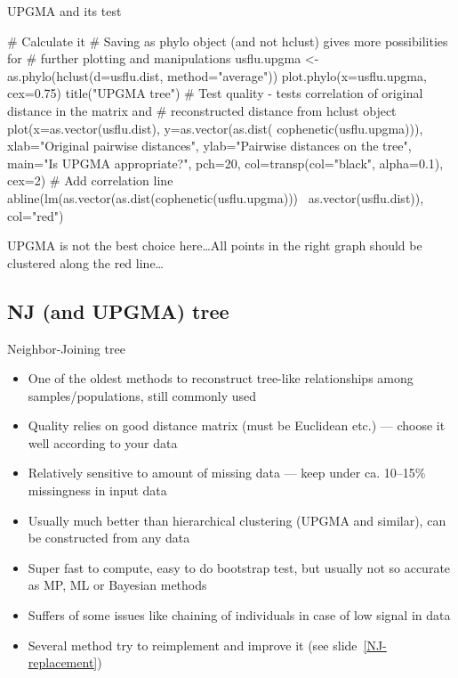 \documentclass[compress, xelatex, 11pt, xcolor=svgnames, aspectratio=169,
	hyperref={
		bookmarks=true,
		unicode=true,
		colorlinks=true,
		pdftitle={Molecular data in R},
		plainpages=false,
		pdfauthor={Vojtech Zeisek},
		pdfsubject={Course about phylogeny and evolution in R},
		pdfcreator={XeLaTeX},
		pdfkeywords={R, evolution, phylogeny, molecular data},
		linkcolor=Crimson, %
		anchorcolor=Magenta, %
		citecolor=Magenta, %
		filecolor=Magenta, %
		menucolor=Magenta, %
		urlcolor=DodgerBlue, %
		},
	url={hyphens, lowtilde} %
	]{beamer}
\renewcommand{\texttt}[1]{\colorbox{Beige}{{\ttfamily #1}}}
\begin{document}
\begin{frame}[fragile]{UPGMA and its test}
	\begin{spluscode}
    # Calculate it
    # Saving as phylo object (and not hclust) gives more possibilities for
    # further plotting and manipulations
    usflu.upgma <- as.phylo(hclust(d=usflu.dist, method="average"))
    plot.phylo(x=usflu.upgma, cex=0.75)
    title("UPGMA tree")
    # Test quality - tests correlation of original distance in the matrix and
    # reconstructed distance from hclust object
    plot(x=as.vector(usflu.dist), y=as.vector(as.dist(
      cophenetic(usflu.upgma))), xlab="Original pairwise distances",
      ylab="Pairwise distances on the tree", main="Is UPGMA
      appropriate?", pch=20, col=transp(col="black",
      alpha=0.1), cex=2)
    # Add correlation line
    abline(lm(as.vector(as.dist(cophenetic(usflu.upgma)))~
      as.vector(usflu.dist)), col="red")
	\end{spluscode}
\end{frame}

\begin{frame}{UPGMA is not the best choice here\ldots}{All points in the right graph should be clustered along the red line\ldots}
	\begin{center}
		\texttt{[image: upgma.png]}
	\end{center}
\end{frame}

\subsection{NJ (and UPGMA) tree}

\begin{frame}{Neighbor-Joining tree}
	\label{NJ}
	\begin{itemize}
		\item One of the oldest methods to reconstruct tree-like relationships among samples/populations, still commonly used
		\item Quality relies on good distance matrix (must be Euclidean etc.) --- choose it well according to your data
		\item Relatively sensitive to amount of missing data --- keep under ca. 10--15\% missingness in input data
		\item Usually much better than hierarchical clustering (UPGMA and similar), can be constructed from any data
		\item Super fast to compute, easy to do bootstrap test, but usually not so accurate as MP, ML or Bayesian methods
		\item Suffers of some issues like chaining of individuals in case of low signal in data
		\item Several method try to reimplement and improve it (see slide~\ref{NJ-replacement})
	\end{itemize}
\end{frame}
\end{document}
